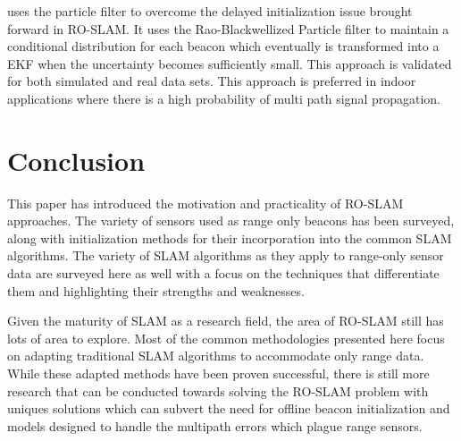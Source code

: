 \documentclass[conference]{IEEEtran}
\begin{document}
	

  	\cite{Blanco2008a} uses the particle filter to overcome the delayed initialization issue brought forward in RO-SLAM. It uses the Rao-Blackwellized Particle filter to maintain a conditional distribution for each beacon which eventually is transformed into a EKF when the uncertainty becomes sufficiently small. This approach is validated for both simulated and real data sets. This approach is preferred in indoor applications where there is a high probability of multi path signal propagation.

	
	
	
	
	
	
	
	
	
	
	
	
	
	
	
	
	\section{Conclusion}
	\label{conclusion}
	This paper has introduced the motivation and practicality of RO-SLAM approaches. The variety of sensors used as range only beacons has been surveyed, along with initialization methods for their incorporation into the common SLAM algorithms. The variety of SLAM algorithms as they apply to range-only sensor data are surveyed here as well with a focus on the techniques that differentiate them and highlighting their strengths and weaknesses.

	Given the maturity of SLAM as a research field, the area of RO-SLAM still has lots of area to explore. Most of the common methodologies presented here focus on adapting traditional SLAM algorithms to accommodate only range data. While these adapted methods have been proven successful, there is still more research that can be conducted towards solving the RO-SLAM problem with uniques solutions which can subvert the need for offline beacon initialization and models designed to handle the multipath errors which plague range sensors.
	
	
	
	
	
	
	
	
	
	
\end{document}
